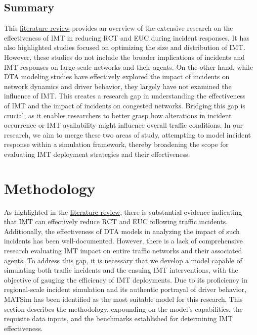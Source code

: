 \documentclass[fancy, oneside, mastersfancy, ms]{byuthesis}
\begin{document}
\hypertarget{sec-lit_summary}{%
\section{Summary}\label{sec-lit_summary}}

This \protect\hyperlink{sec-literature}{literature review} provides an
overview of the extensive research on the effectiveness of IMT in
reducing RCT and EUC during incident responses. It has also highlighted
studies focused on optimizing the size and distribution of IMT. However,
these studies do not include the broader implications of incidents and
IMT responses on large-scale networks and their agents. On the other
hand, while DTA modeling studies have effectively explored the impact of
incidents on network dynamics and driver behavior, they largely have not
examined the influence of IMT. This creates a research gap in
understanding the effectiveness of IMT and the impact of incidents on
congested networks. Bridging this gap is crucial, as it enables
researchers to better grasp how alterations in incident occurrence or
IMT availability might influence overall traffic conditions. In our
research, we aim to merge these two areas of study, attempting to model
incident response within a simulation framework, thereby broadening the
scope for evaluating IMT deployment strategies and their effectiveness.


\hypertarget{sec-methods}{%
\chapter{Methodology}\label{sec-methods}}

As highlighted in the \protect\hyperlink{sec-literature}{literature
review}, there is substantial evidence indicating that IMT can
effectively reduce RCT and EUC following traffic incidents.
Additionally, the effectiveness of DTA models in analyzing the impact of
such incidents has been well-documented. However, there is a lack of
comprehensive research evaluating IMT impact on entire traffic networks
and their associated agents. To address this gap, it is necessary that
we develop a model capable of simulating both traffic incidents and the
ensuing IMT interventions, with the objective of gauging the efficiency
of IMT deployments. Due to its proficiency in regional-scale incident
simulation and its authentic portrayal of driver behavior, MATSim has
been identified as the most suitable model for this research. This
section describes the methodology, expounding on the model's
capabilities, the requisite data inputs, and the benchmarks established
for determining IMT effectiveness.
\end{document}

